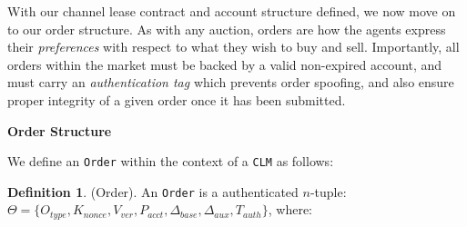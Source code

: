 \documentclass[10pt,a4paper]{article}
\theoremstyle{definition}
\newtheorem{definition}{Definition}[section]
\begin{document}
With our channel lease contract and account structure defined, we now move on
to our order structure. As with any auction, orders are how the agents express
their \emph{preferences} with respect to what they wish to buy and sell.
Importantly, all orders within the market must be backed by a valid non-expired
account, and must carry an \emph{authentication tag} which prevents order
spoofing, and also ensure proper integrity of a given order once it has been
submitted.

\begin{center}
\textbf{Order Structure}
\end{center}

We define an \texttt{Order} within the context of a \texttt{CLM} as follows: 

\theoremstyle{definition}
\begin{definition}{(Order).}
    An \texttt{Order} is a authenticated $n$-tuple: \\ $\Theta = \{O_{type}, K_{nonce},
    V_{ver}, P_{acct}, \Delta_{base}, \Delta_{aux}, T_{auth} \} $, where:

\end{definition}
\end{document}
